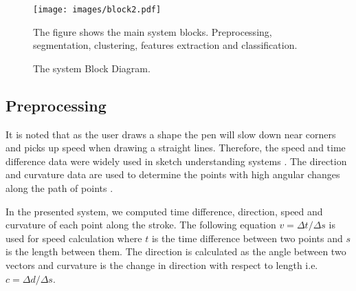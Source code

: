 \documentclass[a4paper,10pt]{IEEEconf}
\begin{document}
\begin{figure}[]
	\centering
		\texttt{[image: images/block2.pdf]}%
	\caption{The system Block Diagram.} The figure shows the main system blocks. Preprocessing, segmentation, clustering,  features extraction and classification. 
	
	\label{fig:Blockdiagram}
\end{figure}

\subsection{Preprocessing}
\label{Prepross}
 It is noted that as the user draws a shape the pen will slow down near corners and picks up speed when drawing a straight lines. Therefore, the speed and time difference data were widely used in sketch understanding systems \cite{earlyprocess}.  The direction and curvature data are used to determine the points with high angular changes along the path of points \cite{meanshift10}.  
 
 In the presented system, we computed time difference, direction, speed and curvature of each point along the stroke. The following equation $v=\Delta t/\Delta s$ is used for speed calculation where $t$ is the time difference between two points and $s$ is the length between them. The direction is calculated as the angle between two vectors and curvature is the change in direction with respect to length i.e. $c= \Delta d/\Delta s$.
 
\end{document}
